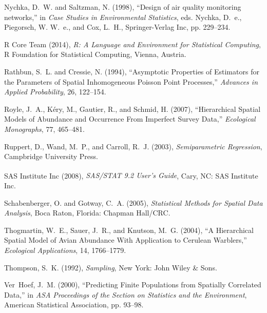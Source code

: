 \documentclass[12pt, titlepage]{article}\usepackage[]{graphicx}\usepackage[]{color}
\begin{document}
\begin{thebibliography}{47}
Nychka, D.~W. and Saltzman, N. (1998), \enquote{Design of air quality
  monitoring networks,} in \textit{Case Studies in Environmental Statistics},
  eds. Nychka, D.~e., Piegorsch, W. W.~e., and Cox, L.~H., Springer-Verlag Inc,
  pp. 229--234.

{R Core Team} (2014), \textit{R: A Language and Environment for Statistical
  Computing}, R Foundation for Statistical Computing, Vienna, Austria.

Rathbun, S.~L. and Cressie, N. (1994), \enquote{Asymptotic Properties of
  Estimators for the Parameters of Spatial Inhomogeneous Poisson Point
  Processes,} \textit{Advances in Applied Probability}, 26, 122--154.

Royle, J.~A., K\'ery, M., Gautier, R., and Schmid, H. (2007),
  \enquote{Hierarchical Spatial Models of Abundance and Occurrence From
  Imperfect Survey Data,} \textit{Ecological Monographs}, 77, 465--481.

Ruppert, D., Wand, M.~P., and Carroll, R.~J. (2003), \textit{Semiparametric
  Regression}, Campbridge University Press.

{SAS Institute Inc} (2008), \textit{SAS/STAT\textsuperscript{\textregistered}
  9.2 User’s Guide}, Cary, NC: SAS Institute Inc.

Schabenberger, O. and Gotway, C.~A. (2005), \textit{Statistical Methods for
  Spatial Data Analysis}, Boca Raton, Florida: Chapman Hall/CRC.

Thogmartin, W.~E., Sauer, J.~R., and Knutson, M.~G. (2004), \enquote{A
  Hierarchical Spatial Model of Avian Abundance With Application to Cerulean
  Warblers,} \textit{Ecological Applications}, 14, 1766--1779.

Thompson, S.~K. (1992), \textit{Sampling}, New York: John Wiley \& Sons.

Ver~Hoef, J.~M. (2000), \enquote{Predicting Finite Populations from Spatially
  Correlated Data,} in \textit{ASA Proceedings of the Section on Statistics and
  the Environment}, American Statistical Association, pp. 93--98.


\end{thebibliography}
\end{document}
